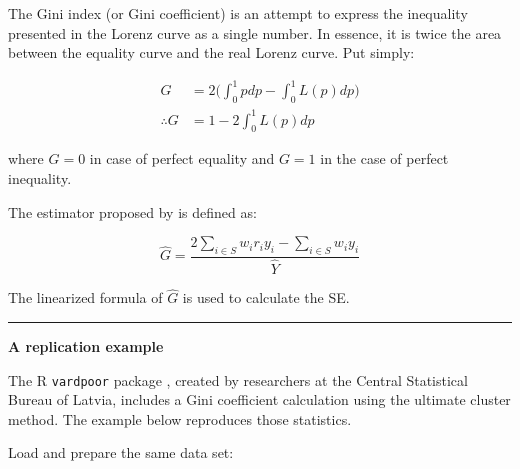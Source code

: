 \documentclass[
]{book}
\begin{document}
The Gini index (or Gini coefficient) is an attempt to express the inequality presented in the Lorenz curve as a single number. In essence, it is twice the area between the equality curve and the real Lorenz curve. Put simply:

\[
\begin{aligned}
G &= 2 \bigg( \int_{0}^{1} pdp - \int_{0}^{1} L(p)dp \bigg) \\
\therefore G &= 1 - 2 \int_{0}^{1} L(p)dp
\end{aligned}
\]

where \(G=0\) in case of perfect equality and \(G = 1\) in the case of perfect inequality.

The estimator proposed by \textcite{osier2009} is defined as:

\[
\widehat{G} = \frac{ 2 \sum_{i \in S} w_i r_i y_i - \sum_{i \in S} w_i y_i }{ \hat{Y} }
\]

The linearized formula of \(\widehat{G}\) is used to calculate the SE.

\begin{center}\rule{0.5\linewidth}{0.5pt}\end{center}

\textbf{A replication example}

The R \texttt{vardpoor} package \autocite{vardpoor}, created by researchers at the Central Statistical Bureau of Latvia, includes a Gini coefficient calculation using the ultimate cluster method. The example below reproduces those statistics.

Load and prepare the same data set:
\end{document}
